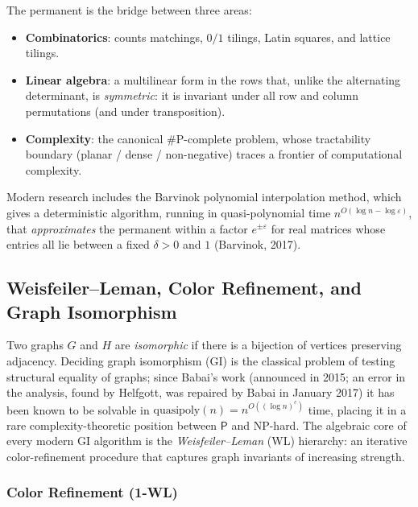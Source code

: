 The permanent is the bridge between three areas:
\begin{itemize}
  \item \textbf{Combinatorics}: counts matchings, $0/1$ tilings,
        Latin squares, and lattice tilings.
  \item \textbf{Linear algebra}: a multilinear form in the rows that,
        unlike the alternating determinant, is \emph{symmetric}: it is
        invariant under all row and column permutations (and under
        transposition).
  \item \textbf{Complexity}: the canonical \#P-complete problem,
        whose tractability boundary (planar / dense / non-negative)
        traces a frontier of computational complexity.
\end{itemize}
Modern research includes the Barvinok polynomial interpolation method,
which gives a deterministic algorithm, running in quasi-polynomial time
$n^{O(\log n - \log \varepsilon)}$, that \emph{approximates} the
permanent within a factor $e^{\pm \varepsilon}$ for real matrices whose
entries all lie between a fixed $\delta > 0$ and $1$ (Barvinok, 2017).

\subsection{Weisfeiler--Leman, Color Refinement, and Graph Isomorphism}\label{subsec:weisfeiler-leman}

Two graphs $G$ and $H$ are \emph{isomorphic} if there is a bijection
of vertices preserving adjacency. Deciding graph isomorphism (GI) is
the classical problem of testing structural equality of graphs;
since Babai's work (announced in 2015; an error in the analysis,
found by Helfgott, was repaired by Babai in January 2017) it has been
known to be solvable in
$\mathrm{quasipoly}(n) = n^{O((\log n)^c)}$ time, placing
it in a rare complexity-theoretic position between $\mathsf{P}$ and
\textsf{NP-hard}. The algebraic core of every modern GI algorithm
is the \emph{Weisfeiler--Leman} (WL) hierarchy: an iterative
color-refinement procedure that captures graph invariants of
increasing strength.

\subsubsection{Color Refinement (1-WL)}

